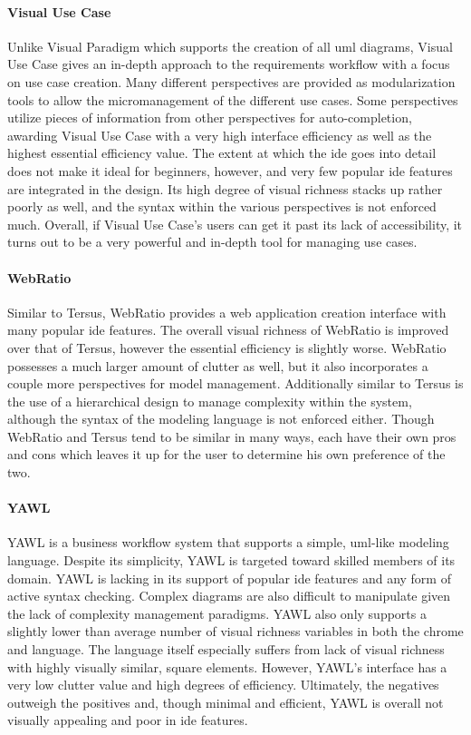 \paragraph{Visual Use Case} Unlike Visual Paradigm which supports the
creation of all \ac{uml} diagrams, Visual Use Case gives an in-depth
approach to the requirements workflow with a focus on use case creation.
Many different perspectives are provided as modularization tools to allow
the micromanagement of the different use cases. Some perspectives utilize
pieces of information from other perspectives for auto-completion, awarding
Visual Use Case with a very high interface efficiency as well as the
highest essential efficiency value. The extent at which the \ac{ide} goes
into detail does not make it ideal for beginners, however, and very few
popular \ac{ide} features are integrated in the design. Its high degree of
visual richness stacks up rather poorly as well, and the syntax within the
various perspectives is not enforced much. Overall, if Visual Use Case's
users can get it past its lack of accessibility, it turns out to be a very
powerful and in-depth tool for managing use cases.

\paragraph{WebRatio} Similar to Tersus, WebRatio provides a web application
creation interface with many popular \ac{ide} features. The overall visual
richness of WebRatio is improved over that of Tersus, however the essential
efficiency is slightly worse. WebRatio possesses a much larger amount of
clutter as well, but it also incorporates a couple more perspectives for
model management. Additionally similar to Tersus is the use of a
hierarchical design to manage complexity within the system, although the
syntax of the modeling language is not enforced either. Though WebRatio and
Tersus tend to be similar in many ways, each have their own pros and cons
which leaves it up for the user to determine his own preference of the
two.

\paragraph{YAWL} YAWL is a business workflow system that supports a simple,
\acs{uml}-like modeling language. Despite its simplicity, YAWL is targeted
toward skilled members of its domain. YAWL is lacking in its support of
popular \ac{ide} features and any form of active syntax checking. Complex
diagrams are also difficult to manipulate given the lack of complexity
management paradigms.  YAWL also only supports a slightly lower than
average number of visual richness variables in both the chrome and
language. The language itself especially suffers from lack of visual
richness with highly visually similar, square elements. However, YAWL's
interface has a very low clutter value and high degrees of efficiency.
Ultimately, the negatives outweigh the positives and, though minimal and
efficient, YAWL is overall not visually appealing and poor in \ac{ide} features.

